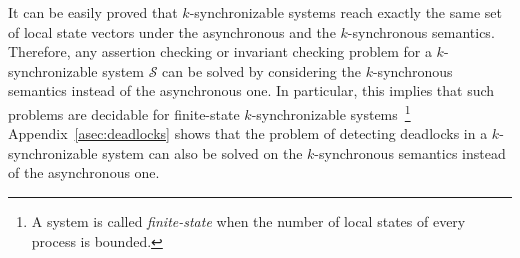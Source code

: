 It can be easily proved that $k$-synchronizable systems reach exactly the same set of local state vectors under the asynchronous and the $k$-synchronous semantics. Therefore, any assertion checking or invariant checking problem for a $k$-synchronizable system $\mathcal{S}$ can be solved by considering the $k$-synchronous semantics instead of the asynchronous one. 
In particular, this implies that such problems are decidable for finite-state $k$-synchronizable systems~\footnote{A system is called \emph{finite-state} when the number of local states of every process is bounded.} 
%
Appendix~\ref{asec:deadlocks} shows that the problem of detecting deadlocks in a $k$-synchronizable system can also be solved on the $k$-synchronous semantics instead of the asynchronous one.

